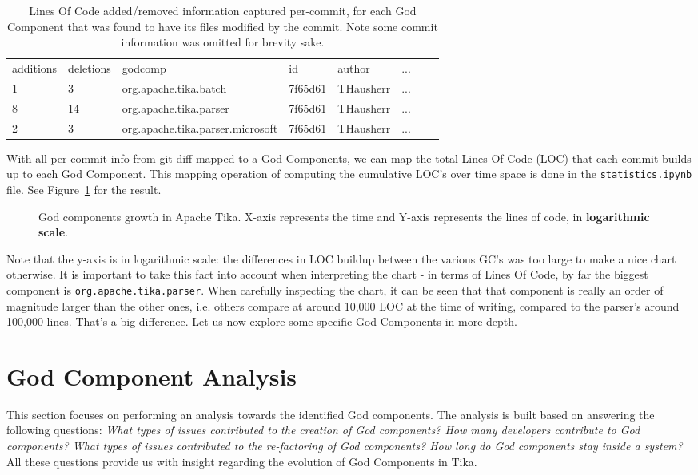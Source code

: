 \documentclass{article}
\begin{document}
\begin{table}[ht]
\begin{tabular}{llllllll}
additions & deletions & godcomp                          & id                                       & author    & ...\\
1         & 3         & org.apache.tika.batch            & 7f65d61 & THausherr & ... \\
8         & 14        & org.apache.tika.parser           & 7f65d61 & THausherr & ... \\
2         & 3         & org.apache.tika.parser.microsoft & 7f65d61 & THausherr & ... \\
\end{tabular}
\caption{Lines Of Code added/removed information captured per-commit, for each God Component that was found to have its files modified by the commit. Note some commit information was omitted for brevity sake.}
\label{tab:locs}
\end{table}

With all per-commit info from git diff mapped to a God Components, we can map the total Lines Of Code (LOC) that each commit builds up to each God Component. This mapping operation of computing the cumulative LOC's over time space is done in the \texttt{statistics.ipynb} file. See Figure~\ref{fig:loc_growth} for the result.

\begin{figure}[ht]
    \centering
    
    \label{fig:loc_growth}
    \caption{God components growth in Apache Tika. X-axis represents the time and Y-axis represents the lines of code, in \textbf{logarithmic scale}.}
\end{figure}

Note that the y-axis is in logarithmic scale: the differences in LOC buildup between the various GC's was too large to make a nice chart otherwise. It is important to take this fact into account when interpreting the chart - in terms of Lines Of Code, by far the biggest component is \texttt{org.apache.tika.parser}. When carefully inspecting the chart, it can be seen that that component is really an order of magnitude larger than the other ones, i.e. others compare at around 10,000 LOC at the time of writing, compared to the parser's around 100,000 lines. That's a big difference. Let us now explore some specific God Components in more depth.

\section{God Component Analysis}
This section focuses on performing an analysis towards the identified God components. The analysis is built based on answering the following questions: \textit{What types of issues contributed to the creation of God components? How many developers contribute to God components? What types of issues contributed to the re-factoring of God components? How long do God components stay inside a system?} All these questions provide us with insight regarding the evolution of God Components in Tika.
\end{document}
